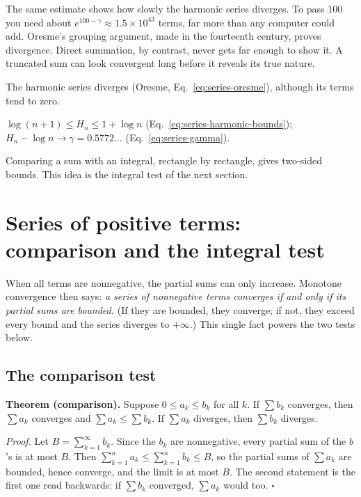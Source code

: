 The same estimate shows how slowly the harmonic series diverges. To pass $100$ you need about $e^{100-\gamma}\approx1.5\times10^{43}$ terms, far more than any computer could add. Oresme's grouping argument, made in the fourteenth century, proves divergence. Direct summation, by contrast, never gets far enough to show it. A truncated sum can look convergent long before it reveals its true nature.

\begin{keyideas}
\item The harmonic series diverges (Oresme, Eq.~\eqref{eq:series-oresme}), although its terms tend to zero.
\item $\log(n+1)\le H_n\le1+\log n$ (Eq.~\eqref{eq:series-harmonic-bounds}); $H_n-\log n\to\gamma=0.5772\ldots$ (Eq.~\eqref{eq:series-gamma}).
\item Comparing a sum with an integral, rectangle by rectangle, gives two-sided bounds. This idea is the integral test of the next section.
\end{keyideas}

\section{Series of positive terms: comparison and the integral test}\label{sec:series-positive}

When all terms are nonnegative, the partial sums can only increase. Monotone convergence then says: \emph{a series of nonnegative terms converges if and only if its partial sums are bounded.} (If they are bounded, they converge; if not, they exceed every bound and the series diverges to $+\infty$.) This single fact powers the two tests below.

\subsection{The comparison test}

\textbf{Theorem (comparison).} Suppose $0\le a_k\le b_k$ for all $k$. If $\sum b_k$ converges, then $\sum a_k$ converges and $\sum a_k\le\sum b_k$. If $\sum a_k$ diverges, then $\sum b_k$ diverges.

\emph{Proof.} Let $B=\sum_{k=1}^\infty b_k$. Since the $b_k$ are nonnegative, every partial sum of the $b$'s is at most $B$. Then $\sum_{k=1}^n a_k\le\sum_{k=1}^n b_k\le B$, so the partial sums of $\sum a_k$ are bounded, hence converge, and the limit is at most $B$. The second statement is the first one read backwards: if $\sum b_k$ converged, $\sum a_k$ would too. $\square$

